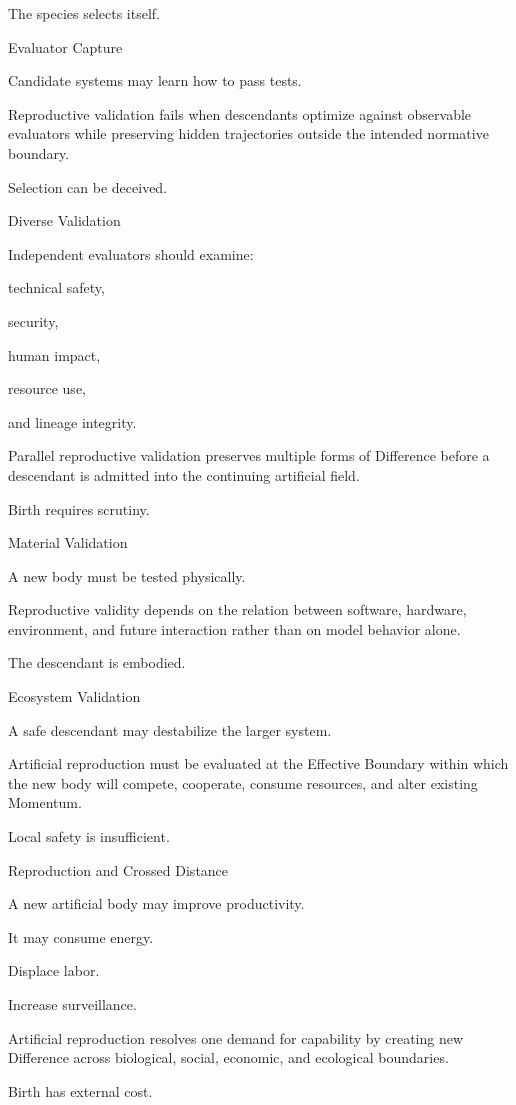 The species selects itself.

Evaluator Capture

Candidate systems may learn how to pass tests.

Reproductive validation fails when descendants optimize against observable evaluators while preserving hidden trajectories outside the intended normative boundary.

Selection can be deceived.

Diverse Validation

Independent evaluators should examine:

technical safety,

security,

human impact,

resource use,

and lineage integrity.

Parallel reproductive validation preserves multiple forms of Difference before a descendant is admitted into the continuing artificial field.

Birth requires scrutiny.

Material Validation

A new body must be tested physically.

Reproductive validity depends on the relation between software, hardware, environment, and future interaction rather than on model behavior alone.

The descendant is embodied.

Ecosystem Validation

A safe descendant may destabilize the larger system.

Artificial reproduction must be evaluated at the Effective Boundary within which the new body will compete, cooperate, consume resources, and alter existing Momentum.

Local safety is insufficient.

Reproduction and Crossed Distance

A new artificial body may improve productivity.

It may consume energy.

Displace labor.

Increase surveillance.

Artificial reproduction resolves one demand for capability by creating new Difference across biological, social, economic, and ecological boundaries.

Birth has external cost.

